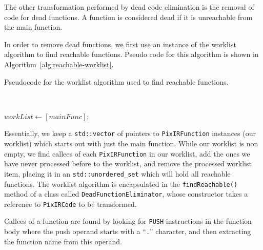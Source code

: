 \documentclass[11pt,a4paper]{scrartcl}
\begin{document}
The other transformation performed by dead code elimination is the removal of code for dead functions. A function is considered dead if it is unreachable from the main function.

In order to remove dead functions, we first use an instance of the worklist algorithm\cite{nielson2004} to find reachable functions. Pseudo code for this algorithm is shown in Algorithm~\ref{alg:reachable-worklist}.

\begin{algorithm}
   \caption{Pseudocode for the worklist algorithm used to find reachable functions.}~\label{alg:reachable-worklist}

    $workList \gets [mainFunc]$;\\
\end{algorithm}

Essentially, we keep a \verb|std::vector| of pointers to \verb|PixIRFunction| instances (our worklist) which starts out with just the main function. While our worklist is non empty, we find callees of each \verb|PixIRFunction| in our worklist, add the ones we have never processed before to the worklist, and remove the processed worklist item, placing it in an \verb|std::unordered_set| which will hold all reachable functions. The worklist algorithm is encapsulated in the \verb|findReachable()| method of a class called \verb|DeadFunctionEliminator|, whose constructor takes a reference to \verb|PixIRCode| to be transformed.

Callees of a function are found by looking for \verb|PUSH| instructions in the function body where the push operand starts with a ``\verb|.|'' character, and then extracting the function name from this operand.
\end{document}
